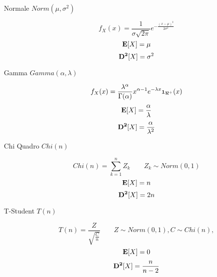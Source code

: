 \begin{description}
	\item[Normale $Norm(\mu,\sigma^{2})$]
		\begin{equation}
		f_{X}(x)=\frac{1}{\sigma\sqrt{2\pi}}e^{-\frac{(x-\mu)^{2}}{2\sigma^{2}}}
		\end{equation}
		\begin{equation}
		\mathbf{E}[X]=\mu
		\end{equation}
		\begin{equation}
		\mathbf{D^{2}}[X]=\sigma^{2}
		\end{equation}
		
	\item[Gamma $Gamma(\alpha,\lambda)$]
		\begin{equation}
		f_{X}(x)=\frac{\lambda^{\alpha}}{\Gamma(\alpha)}x^{\alpha-1}e^{-\lambda x}\mathfrak{1}_{\Re^{+}}(x)
		\end{equation}
		\begin{equation}
		\mathbf{E}[X]=\frac{\alpha}{\lambda}
		\end{equation}
		\begin{equation}
		\mathbf{D^{2}}[X]=\frac{\alpha}{\lambda^{2}}
		\end{equation}
		
	\item[Chi Quadro $Chi(n)$]
		\begin{equation}
		Chi(n) = \sum_{k=1}^{n}Z_{k}
		\qquad
		Z_{k}\sim Norm(0,1)
		\end{equation}
		\begin{equation}
		\mathbf{E}[X]=n
		\end{equation}
		\begin{equation}
		\mathbf{D^{2}}[X]=2n
		\end{equation}
		
	\item[T-Student $T(n)$]
		\begin{equation}
		T(n) = \frac{Z}{\sqrt{\frac{C}{n}}}
		\qquad
		Z\sim Norm(0,1),
		C\sim Chi(n),
		\end{equation}
		\begin{equation}
		\mathbf{E}[X]=0
		\end{equation}
		\begin{equation}
		\mathbf{D^{2}}[X]=\frac{n}{n-2}
		\end{equation}


\end{description}
